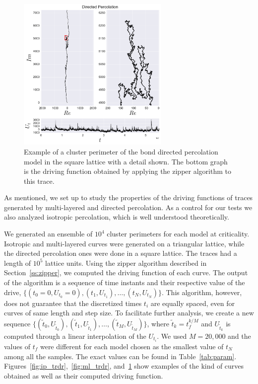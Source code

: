 \begin{figure}
\begin{center}
    \includegraphics[width=0.65\textwidth]{chapters/ch6-asle/figs/dp_trdr}
\end{center}
\caption{Example of a cluster perimeter of the bond directed percolation model
    in the square lattice with a detail shown. The bottom graph is the driving
    function obtained by applying the zipper algorithm to this trace.}
\label{fig:dp_trdr}
\end{figure}

As mentioned, we set up to study the properties of the driving functions of
traces generated by multi-layered and directed percolation. As a control for
our tests we also analyzed isotropic percolation, which is well understood
theoretically.

We generated an ensemble of $10^4$ cluster perimeters for each model at
criticality. Isotropic and multi-layered curves were generated on a triangular
lattice, while the directed percolation ones were done in a square lattice. The
traces had a length of $10^5$ lattice units. Using the zipper algorithm
described in Section~\ref{ss:zipper}, we computed the driving function of each
curve. The output of the algorithm is a sequence of time instants and their
respective value of the drive, $\{(t_0=0, U_{t_0}=0), (t_1, U_{t_1}), \ldots,
(t_N, U_{t_N})\}$. This algorithm, however, does not guarantee that the
discretized times $t_i$ are equally spaced, even for curves of same length and
step size. To facilitate further analysis, we create a new sequence
$\{(\tilde{t}_{0}, U_{\tilde{t}_{0}}), (\tilde{t}_{1}, U_{\tilde{t}_{1}}),
\ldots, (\tilde{t}_{M}, U_{\tilde{t}_{M}})\}$, where $\tilde{t}_k = t_f^{k/M}$
and $U_{\tilde{t}_k}$ is computed through a linear interpolation of the
$U_{t_i}$. We used $M=20,000$ and the values of $t_f$ were different for each
model chosen as the smallest value of $t_N$ among all the samples. The exact
values can be found in Table~\ref{tab:param}.
Figures~\ref{fig:ip_trdr},~\ref{fig:ml_trdr}, and~\ref{fig:dp_trdr} show
examples of the kind of curves obtained as well as their computed driving
function.

